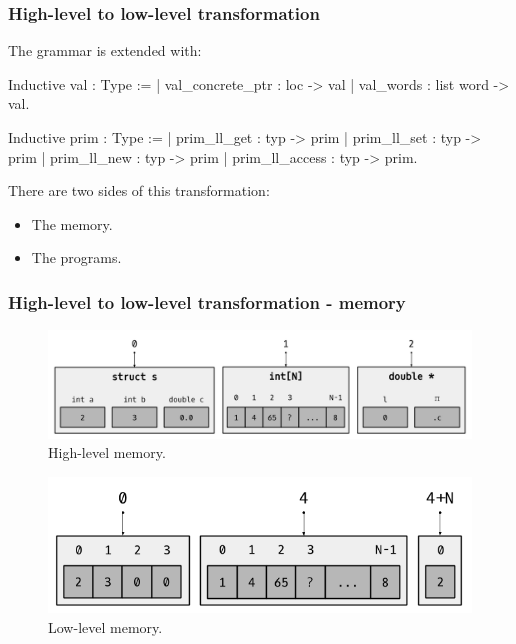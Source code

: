 \begin{frame}[fragile]
\frametitle{High-level to low-level transformation}

The grammar is extended with:

\begin{coqs}
  Inductive val : Type :=
    | val_concrete_ptr : loc -> val
    | val_words : list word -> val.

  Inductive prim : Type :=
    | prim_ll_get : typ -> prim
    | prim_ll_set : typ -> prim
    | prim_ll_new : typ -> prim
    | prim_ll_access : typ -> prim.
\end{coqs}

\bigskip \pause

There are two sides of this transformation:
\begin{itemize}
	\item The memory.
	\item The programs.
\end{itemize}

\end{frame}


\begin{frame}[fragile]
\frametitle{High-level to low-level transformation - memory}

\begin{center}

\begin{figure}
	\includegraphics[scale=0.31]{images/high_level_memory}
	\caption{High-level memory.}
\end{figure}

\begin{figure}
	\includegraphics[scale=0.31]{images/low_level_memory}
	\caption{Low-level memory.}
\end{figure}

\end{center}

\end{frame}


